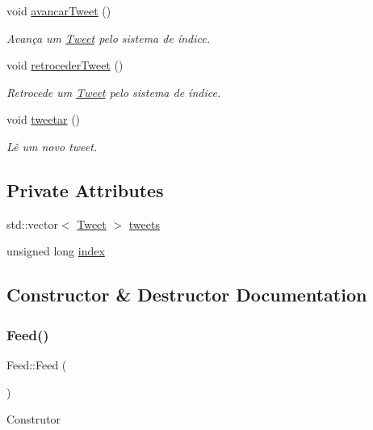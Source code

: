 \begin{DoxyCompactItemize}
void \hyperlink{class_feed_ae02e321e3c623da6d4470a9f232c5b5f}{avancar\+Tweet} ()
\begin{DoxyCompactList}\small\item\em Avança um \hyperlink{class_tweet}{Tweet} pelo sistema de índice. \end{DoxyCompactList}\item 
void \hyperlink{class_feed_a0ddcec41ebdc9c0c5083de40463229cc}{retroceder\+Tweet} ()
\begin{DoxyCompactList}\small\item\em Retrocede um \hyperlink{class_tweet}{Tweet} pelo sistema de índice. \end{DoxyCompactList}\item 
void \hyperlink{class_feed_ab5eb6b52ae8ab029ea508cf09bee54bd}{tweetar} ()
\begin{DoxyCompactList}\small\item\em Lê um novo tweet. \end{DoxyCompactList}\end{DoxyCompactItemize}
\subsection*{Private Attributes}
\begin{DoxyCompactItemize}
\item 
std\+::vector$<$ \hyperlink{class_tweet}{Tweet} $>$ \hyperlink{class_feed_a8afb1f424999ddaec50fcea891798e9c}{tweets}
\item 
unsigned long \hyperlink{class_feed_a50b41b766279c79a17506ff536ab38bd}{index}
\end{DoxyCompactItemize}


\subsection{Constructor \& Destructor Documentation}
\mbox{\label{class_feed_a925b84cc511eada7ee7e4019a0d48710}} 
\subsubsection{\texorpdfstring{Feed()}{Feed()}}
{\footnotesize\ttfamily Feed\+::\+Feed (\begin{DoxyParamCaption}{ }\end{DoxyParamCaption})}

Construtor 

